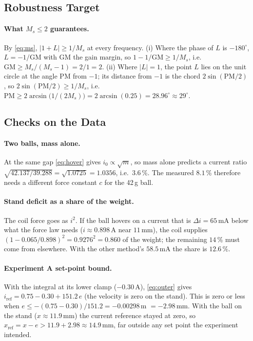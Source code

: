 \documentclass[11pt,a4paper]{article}
\begin{document}
\subsection{Robustness Target}
\label{sec:calc-ms}
\paragraph{What $M_s \le 2$ guarantees.} By \eqref{eq:ms}, $|1 + L| \ge 1/M_s$ at every frequency. (i) Where the phase of $L$ is
$-180^\circ$, $L = -1/\mathrm{GM}$ with GM the gain margin, so $1 - 1/\mathrm{GM} \ge 1/M_s$, i.e.\
$\mathrm{GM} \ge M_s/(M_s - 1) = 2/1 = 2$. (ii) Where $|L| = 1$, the point $L$ lies on the unit circle at the angle PM from
$-1$; its distance from $-1$ is the chord $2\sin(\mathrm{PM}/2)$, so $2\sin(\mathrm{PM}/2) \ge 1/M_s$, i.e.\
$\mathrm{PM} \ge 2\arcsin\bigl(1/(2M_s)\bigr) = 2\arcsin(0.25) = 28.96^\circ \approx 29^\circ$.

\subsection{Checks on the Data}
\label{sec:calc-data}
\paragraph{Two balls, mass alone.} At the same gap \eqref{eq:hover} gives $i_0 \propto \sqrt{m}$, so mass alone predicts a
current ratio $\sqrt{42.137/39.288} = \sqrt{1.0725} = 1.0356$, i.e.\ $3.6\,\%$. The measured $8.1\,\%$ therefore needs a
different force constant $c$ for the 42\,g ball.

\paragraph{Stand deficit as a share of the weight.} The coil force goes as $i^2$. If the ball hovers on a current that is
$\Delta i = 65$\,mA below what the force law needs ($i \approx 0.898$\,A near $11$\,mm), the coil supplies
$(1 - 0.065/0.898)^2 = 0.9276^2 = 0.860$ of the weight; the remaining $14\,\%$ must come from elsewhere. With the other method's
$58.5$\,mA the share is $12.6\,\%$.

\paragraph{Experiment A set-point bound.} With the integral at its lower clamp ($-0.30$\,A), \eqref{eq:outer} gives
$i_{\mathrm{ref}} = 0.75 - 0.30 + 151.2\,e$ (the velocity is zero on the stand). This is zero or less when
$e \le -(0.75 - 0.30)/151.2 = -0.00298$\,m $= -2.98$\,mm. With the ball on the stand ($x \approx 11.9$\,mm) the current reference
stayed at zero, so $x_{\mathrm{ref}} = x - e > 11.9 + 2.98 \approx 14.9$\,mm, far outside any set point the experiment intended.
\end{document}
